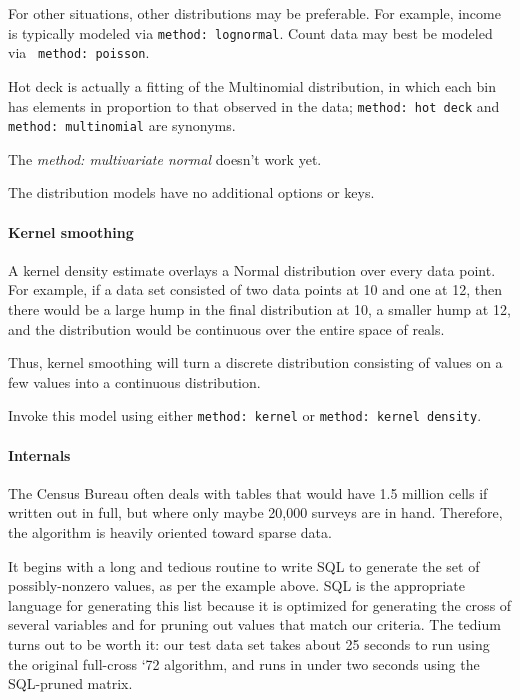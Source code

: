 \documentclass{article}
\begin{document}
For other situations, other distributions may be preferable. For example, income is
typically modeled via {\tt method: lognormal}. Count data may best be modeled via {\tt
method: poisson}.

Hot deck is actually a fitting of the Multinomial distribution, in which each bin has
elements in proportion to that observed in the data; {\tt method: hot deck} and {\tt
method: multinomial} are synonyms.

The {\em method: multivariate normal} doesn't work yet.

The distribution models have no additional options or keys.

\paragraph{Kernel smoothing} A kernel density estimate overlays a Normal distribution over
every data point. For example, if a data set consisted of two data points at 10 and one at
12, then there would be a large hump in the final distribution at 10, a smaller hump at
12, and the distribution would be continuous over the entire space of reals.

Thus, kernel smoothing will turn a discrete distribution consisting of values on a
few values into a continuous distribution.

Invoke this model using either {\tt method: kernel} or {\tt method: kernel density}.


\paragraph{Internals}
The Census Bureau often deals with tables that would have 1.5 million cells if written
out in full, but where only maybe 20,000 surveys are in hand. Therefore, the algorithm
is heavily oriented toward sparse data.

It begins with a long and tedious routine to write SQL to generate the set of
possibly-nonzero values, as per the example above. SQL is the appropriate language
for generating this list because it is optimized for generating the cross of several
variables and for pruning out values that match our criteria. The tedium turns out
to be worth it: our test data set takes about 25 seconds to run using the original
full-cross `72 algorithm, and runs in under two seconds using the SQL-pruned matrix.
\end{document}
